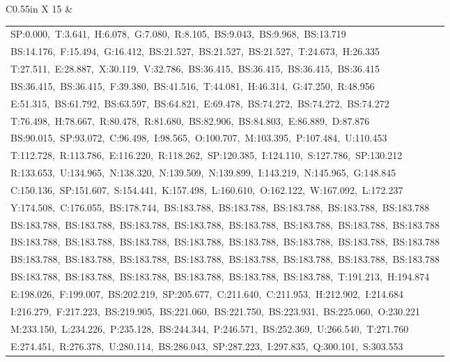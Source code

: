 \documentclass[10pt,a4paper]{article}
\begin{document}
\begin{center}
\begin{tabularx}{\textwidth}{
    C{0.55in}
    X
}
15 &
\begin{tabular}[t]{@{}l@{}}
SP:0.000,\ T:3.641,\ H:6.078,\ G:7.080,\ R:8.105,\ BS:9.043,\ BS:9.968,\ BS:13.719\\
BS:14.176,\ F:15.494,\ G:16.412,\ BS:21.527,\ BS:21.527,\ BS:21.527,\ T:24.673,\ H:26.335\\
T:27.511,\ E:28.887,\ X:30.119,\ V:32.786,\ BS:36.415,\ BS:36.415,\ BS:36.415,\ BS:36.415\\
BS:36.415,\ BS:36.415,\ F:39.380,\ BS:41.516,\ T:44.081,\ H:46.314,\ G:47.250,\ R:48.956\\
E:51.315,\ BS:61.792,\ BS:63.597,\ BS:64.821,\ E:69.478,\ BS:74.272,\ BS:74.272,\ BS:74.272\\
T:76.498,\ H:78.667,\ R:80.478,\ R:81.680,\ BS:82.906,\ BS:84.803,\ E:86.889,\ D:87.876\\
BS:90.015,\ SP:93.072,\ C:96.498,\ I:98.565,\ O:100.707,\ M:103.395,\ P:107.484,\ U:110.453\\
T:112.728,\ R:113.786,\ E:116.220,\ R:118.262,\ SP:120.385,\ I:124.110,\ S:127.786,\ SP:130.212\\
R:133.653,\ U:134.965,\ N:138.320,\ N:139.509,\ N:139.899,\ I:143.219,\ N:145.965,\ G:148.845\\
C:150.136,\ SP:151.607,\ S:154.441,\ K:157.498,\ L:160.610,\ O:162.122,\ W:167.092,\ L:172.237\\
Y:174.508,\ C:176.055,\ BS:178.744,\ BS:183.788,\ BS:183.788,\ BS:183.788,\ BS:183.788,\ BS:183.788\\
BS:183.788,\ BS:183.788,\ BS:183.788,\ BS:183.788,\ BS:183.788,\ BS:183.788,\ BS:183.788,\ BS:183.788\\
BS:183.788,\ BS:183.788,\ BS:183.788,\ BS:183.788,\ BS:183.788,\ BS:183.788,\ BS:183.788,\ BS:183.788\\
BS:183.788,\ BS:183.788,\ BS:183.788,\ BS:183.788,\ BS:183.788,\ BS:183.788,\ BS:183.788,\ BS:183.788\\
BS:183.788,\ BS:183.788,\ BS:183.788,\ BS:183.788,\ BS:183.788,\ BS:183.788,\ T:191.213,\ H:194.874\\
E:198.026,\ F:199.007,\ BS:202.219,\ SP:205.677,\ C:211.640,\ C:211.953,\ H:212.902,\ I:214.684\\
I:216.279,\ F:217.223,\ BS:219.905,\ BS:221.060,\ BS:221.750,\ BS:223.931,\ BS:225.060,\ O:230.221\\
M:233.150,\ L:234.226,\ P:235.128,\ BS:244.344,\ P:246.571,\ BS:252.369,\ U:266.540,\ T:271.760\\
E:274.451,\ R:276.378,\ U:280.114,\ BS:286.043,\ SP:287.223,\ I:297.835,\ Q:300.101,\ S:303.553\\

\end{tabular}
\end{tabularx}
\end{center}
\end{document}
